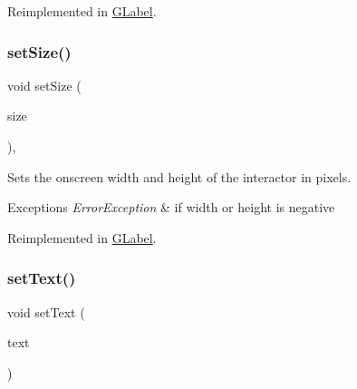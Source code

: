 Reimplemented in \mbox{\hyperlink{classsgl_1_1GLabel_a8ba9af72c23f52d4b93096a13a11f150}{G\+Label}}.

\mbox{\label{classsgl_1_1GInteractor_ae2b628228f192c2702c4ce941b2af68f}} 
\subsubsection{\texorpdfstring{set\+Size()}{setSize()}\hspace{0.1cm}{\footnotesize\ttfamily [2/2]}}
{\footnotesize\ttfamily void set\+Size (\begin{DoxyParamCaption}\item[{const \mbox{\hyperlink{structsgl_1_1GDimension}{G\+Dimension}} \&}]{size }\end{DoxyParamCaption})\hspace{0.3cm}{\ttfamily [virtual]}, {\ttfamily [inherited]}}



Sets the onscreen width and height of the interactor in pixels. 


\begin{DoxyExceptions}{Exceptions}
{\em Error\+Exception} & if width or height is negative \\
\hline
\end{DoxyExceptions}


Reimplemented in \mbox{\hyperlink{classsgl_1_1GLabel_a42d96e60c62d7770993327d7147d77b8}{G\+Label}}.

\mbox{\label{classsgl_1_1GButton_ac1ae51949d41ee9054634be5967d91b8}} 
\subsubsection{\texorpdfstring{set\+Text()}{setText()}}
{\footnotesize\ttfamily void set\+Text (\begin{DoxyParamCaption}\item[{const std\+::string \&}]{text }\end{DoxyParamCaption})\hspace{0.3cm}{\ttfamily [virtual]}}



